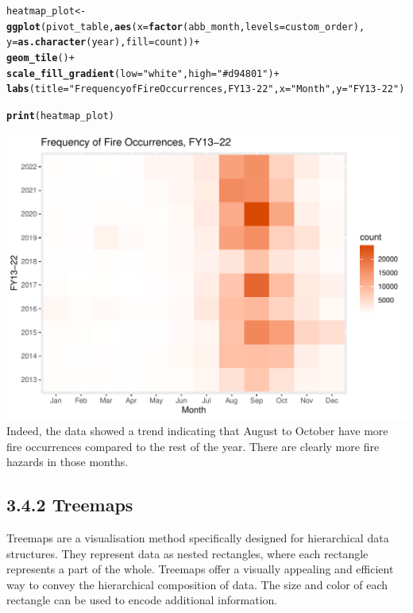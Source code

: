 \documentclass{article}\usepackage[]{graphicx}\usepackage[]{xcolor}
\makeatletter
\def\maxwidth{ %
  \ifdim\Gin@nat@width>\linewidth
    \linewidth
  \else
    \Gin@nat@width
  \fi
}
\newcommand{\hlstr}[1]{\textcolor[rgb]{0.192,0.494,0.8}{#1}}%
\newcommand{\hlopt}[1]{\textcolor[rgb]{0,0,0}{#1}}%
\newcommand{\hlstd}[1]{\textcolor[rgb]{0.345,0.345,0.345}{#1}}%
\newcommand{\hlkwb}[1]{\textcolor[rgb]{0.69,0.353,0.396}{#1}}%
\newcommand{\hlkwc}[1]{\textcolor[rgb]{0.333,0.667,0.333}{#1}}%
\newcommand{\hlkwd}[1]{\textcolor[rgb]{0.737,0.353,0.396}{\textbf{#1}}}%
\newenvironment{kframe}{%
 \def\at@end@of@kframe{}%
 \ifinner\ifhmode%
  \def\at@end@of@kframe{\end{minipage}}%
  \begin{minipage}{\columnwidth}%
 \fi\fi%
 \def\FrameCommand##1{\hskip\@totalleftmargin \hskip-\fboxsep
 \colorbox{shadecolor}{##1}\hskip-\fboxsep
     \hskip-\linewidth \hskip-\@totalleftmargin \hskip\columnwidth}%
 \MakeFramed {\advance\hsize-\width
   \@totalleftmargin\z@ \linewidth\hsize
   \@setminipage}}%
 {\par\unskip\endMakeFramed%
 \at@end@of@kframe}
\newenvironment{knitrout}{}{} %
\makeatother
\begin{document}
\begin{knitrout}
\color{fgcolor}\begin{kframe}
\begin{alltt}
\hlstd{heatmap_plot} \hlkwb{<-} \hlkwd{ggplot}\hlstd{(pivot_table,} \hlkwd{aes}\hlstd{(}\hlkwc{x} \hlstd{=} \hlkwd{factor}\hlstd{(abb_month,} \hlkwc{levels} \hlstd{= custom_order),}
                                        \hlkwc{y} \hlstd{=} \hlkwd{as.character}\hlstd{(year),} \hlkwc{fill} \hlstd{= count))} \hlopt{+}
    \hlkwd{geom_tile}\hlstd{()} \hlopt{+}
    \hlkwd{scale_fill_gradient}\hlstd{(}\hlkwc{low} \hlstd{=} \hlstr{"white"}\hlstd{,} \hlkwc{high} \hlstd{=} \hlstr{"#d94801"}\hlstd{)} \hlopt{+}
    \hlkwd{labs}\hlstd{(}\hlkwc{title} \hlstd{=} \hlstr{"Frequency of Fire Occurrences, FY13-22"}\hlstd{,}\hlkwc{x} \hlstd{=} \hlstr{"Month"}\hlstd{,} \hlkwc{y} \hlstd{=} \hlstr{"FY13-22"}\hlstd{)}

\hlkwd{print}\hlstd{(heatmap_plot)}
\end{alltt}
\end{kframe}
\includegraphics[width=\maxwidth]{figure/fire-by-months_fy13-22-1} 
\end{knitrout}
Indeed, the data showed a trend indicating that August to October have more fire occurrences compared to the rest of the year. There are clearly more fire hazards in those months.

\subsection{3.4.2 Treemaps}
Treemaps are a visualisation method specifically designed for hierarchical data structures. They represent data as nested rectangles, where each rectangle represents a part of the whole. Treemaps offer a visually appealing and efficient way to convey the hierarchical composition of data. The size and color of each rectangle can be used to encode additional information.
\end{document}
